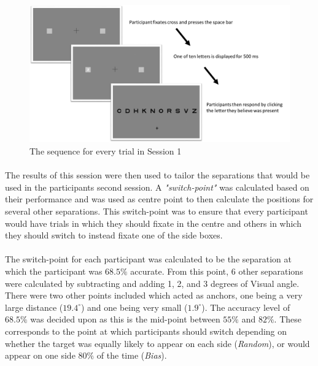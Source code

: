 \documentclass[12pt]{article}
\begin{document}
\begin{figure}[ht!]
	\includegraphics[scale=0.35]{Figures/Experiment_4_prob/Part1_Trial}
	\centering
	\captionsetup{justification=centering}
	\caption{The sequence for every trial in Session 1}
	\label{fig:Session1-Prob}
\end{figure}

\paragraph{} The results of this session were then used to tailor the separations that would be used in the participants second session. A \textit{"switch-point"} was calculated based on their performance and was used as centre point to then calculate the positions for several other separations. This switch-point was to ensure that every participant would have trials in which they should fixate in the centre and others in which they should switch to instead fixate one of the side boxes.

\paragraph{} The switch-point for each participant was calculated to be the separation at which the participant was $68.5\%$ accurate. From this point, 6 other separations were calculated by subtracting and adding 1, 2, and 3 degrees of Visual angle. There were two other points included which acted as anchors, one being a very large distance ($19.4^{\circ}$) and one being very small ($1.9^{\circ}$). The accuracy level of $68.5\%$ was decided upon as this is the mid-point between $55\%$ and $82\%$. These corresponds to the point at which participants should switch depending on whether the target was equally likely to appear on each side (\textit{Random}), or would appear on one side $80\%$ of the time (\textit{Bias}).
\end{document}

